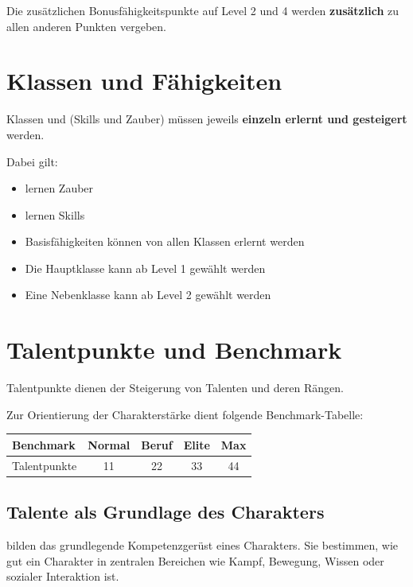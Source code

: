 Die zusätzlichen Bonusfähigkeitspunkte auf Level 2 und 4 werden \textbf{zusätzlich}
zu allen anderen Punkten vergeben.



\section{Klassen und Fähigkeiten}

Klassen und  (Skills und Zauber) müssen jeweils \textbf{einzeln erlernt und gesteigert}
werden.

Dabei gilt:
\begin{itemize}
	\item {} lernen Zauber
	\item {} lernen Skills
	\item Basisfähigkeiten können von allen Klassen erlernt werden
	\item Die Hauptklasse kann ab Level 1 gewählt werden
	\item Eine Nebenklasse kann ab Level 2 gewählt werden
\end{itemize}

\section{Talentpunkte und Benchmark}

Talentpunkte dienen der Steigerung von Talenten und deren Rängen.

Zur Orientierung der Charakterstärke dient folgende Benchmark-Tabelle:

\begin{center}
	\begin{tabular}{lcccc}
		\toprule
		\textbf{Benchmark} & Normal & Beruf & Elite & Max \\
		\midrule
		Talentpunkte & 11 & 22 & 33 & 44 \\
		\bottomrule
	\end{tabular}
\end{center}

\subsection*{Talente als Grundlage des Charakters}

 bilden das grundlegende Kompetenzgerüst eines Charakters.
Sie bestimmen, wie gut ein Charakter in zentralen Bereichen wie Kampf,
Bewegung, Wissen oder sozialer Interaktion ist.

